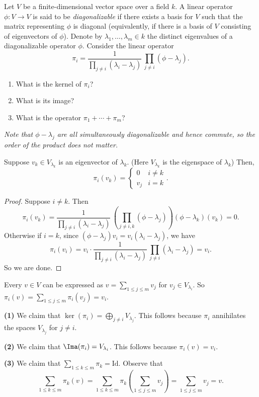 \begin{problem}
Let $V$ be a finite-dimensional vector space over a field $k$. A linear operator $\phi:V\to V$ is said to be {\em diagonalizable} if there exists a basis for $V$ such that the matrix representing $\phi$ is diagonal (equivalently, if there is a basis of $V$ consisting of eigenvectors of $\phi$). Denote by $\lambda_1,\dots,\lambda_m\in k$ the distinct eigenvalues of a diagonalizable operator $\phi$. Consider the linear operator 
\[\pi_i=\frac{1}{\prod_{j\neq i}(\lambda_i-\lambda_j)}\,\prod_{j\neq i} (\phi-\lambda_j).\]
\begin{enumerate}
  \item What is the kernel of $\pi_i$?
  \item What is its image? 
  \item What is the operator $\pi_1+\cdots+\pi_m$?
\end{enumerate}
\end{problem}

\textit{Note that $\phi-\lambda_j$ are all simultaneously diagonalizable and hence commute, so the order of the product does not matter.}

\begin{lemma}
  Suppose $v_k\in V_{\lambda_k}$ is an eigenvector of $\lambda_k$. (Here $V_{\lambda_k}$ is the eigenspace of $\lambda_k$) Then,
  \[
    \pi_i(v_k)=\begin{cases}
      0&i\neq k\\
      v_j&i=k
    \end{cases}
  .\]   
\end{lemma}
\begin{proof}
  Suppose $i\neq k$. Then
  \[
    \pi_i(v_k)=\frac{1}{\prod_{j\neq i}(\lambda_i-\lambda_j)}\,\left(\prod_{j\neq i,k} (\phi-\lambda_j)\right)(\phi-\lambda_k)(v_k)=0
  .\]  
  Otherwise if $i=k$, since $(\phi-\lambda_j)v_i=v_i(\lambda_i-\lambda_j)$, we have
  \[
    \pi_i(v_i)=v_i\cdot\frac{1}{\prod_{j\neq i}(\lambda_i-\lambda_j)}\,\prod_{j\neq i} (\lambda_i-\lambda_j)=v_i
    .\]
  So we are done.
\end{proof}

Every $v\in V$ can be expressed as $v=\sum_{1\leq j \leq m}v_j$ for $v_j\in V_{\lambda_i}$. So $\pi_i(v)=\sum_{1\leq j\leq m}\pi_i(v_j)=v_i$.   

\textbf{(1)} We claim that $\ker(\pi_i)=\bigoplus_{j\neq i}V_{\lambda_j}.$ This follows because $\pi_i$ annihilates the spaces $V_{\lambda_j}$ for $j\neq i$.   

\textbf{(2)} We claim that $\Ima(\pi_i)=V_{\lambda_i}$. This follows because $\pi_i(v)=v_i$. 

\textbf{(3)} We claim that $\sum_{1\leq k\leq m}\pi_k=\mathrm{Id}$. Observe that
\[
  \sum_{1\leq k\leq m}\pi_k(v)=\sum_{1\leq k\leq m}\pi_k\left(\sum_{1\leq j \leq m}v_j\right)=\sum_{1\leq j \leq m}v_j=v
.\]  